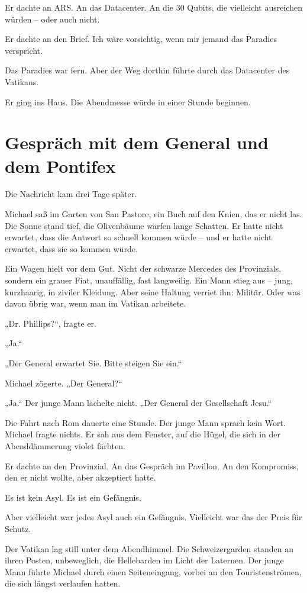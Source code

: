 \documentclass[
]{article}
\begin{document}
Er dachte an ARS. An das Datacenter. An die 30 Qubits, die vielleicht ausreichen würden -- oder auch nicht.

Er dachte an den Brief. Ich wäre vorsichtig, wenn mir jemand das Paradies verspricht.

Das Paradies war fern. Aber der Weg dorthin führte durch das Datacenter des Vatikans.

Er ging ins Haus. Die Abendmesse würde in einer Stunde beginnen.

\section{Gespräch mit dem General und dem Pontifex}\label{gespruxe4ch-mit-dem-general-und-dem-pontifex}

Die Nachricht kam drei Tage später.

Michael saß im Garten von San Pastore, ein Buch auf den Knien, das er nicht las. Die Sonne stand tief, die Olivenbäume warfen lange Schatten. Er hatte nicht erwartet, dass die Antwort so schnell kommen würde -- und er hatte nicht erwartet, dass sie so kommen würde.

Ein Wagen hielt vor dem Gut. Nicht der schwarze Mercedes des Provinzials, sondern ein grauer Fiat, unauffällig, fast langweilig. Ein Mann stieg aus -- jung, kurzhaarig, in ziviler Kleidung. Aber seine Haltung verriet ihn: Militär. Oder was davon übrig war, wenn man im Vatikan arbeitete.

„Dr. Phillips?{\kern0pt}``, fragte er.

„Ja.``

„Der General erwartet Sie. Bitte steigen Sie ein.``

Michael zögerte. „Der General?{\kern0pt}``

„Ja.`` Der junge Mann lächelte nicht. „Der General der Gesellschaft Jesu.``

Die Fahrt nach Rom dauerte eine Stunde. Der junge Mann sprach kein Wort. Michael fragte nichts. Er sah aus dem Fenster, auf die Hügel, die sich in der Abenddämmerung violet färbten.

Er dachte an den Provinzial. An das Gespräch im Pavillon. An den Kompromiss, den er nicht wollte, aber akzeptiert hatte.

Es ist kein Asyl. Es ist ein Gefängnis.

Aber vielleicht war jedes Asyl auch ein Gefängnis. Vielleicht war das der Preis für Schutz.

Der Vatikan lag still unter dem Abendhimmel. Die Schweizergarden standen an ihren Posten, unbeweglich, die Hellebarden im Licht der Laternen. Der junge Mann führte Michael durch einen Seiteneingang, vorbei an den Touristenströmen, die sich längst verlaufen hatten.
\end{document}
